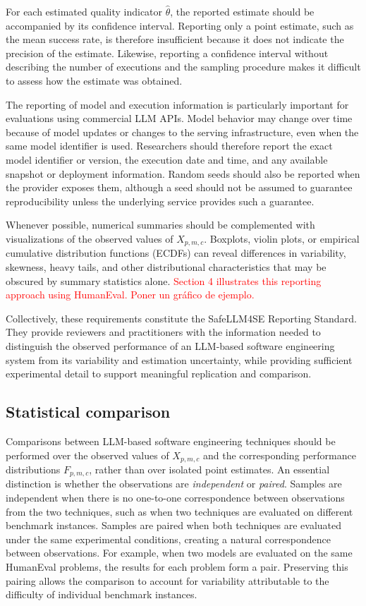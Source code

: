 \documentclass{IEEEcsmag}
\begin{document}
For each estimated quality indicator $\hat{\theta}$, the reported estimate should be accompanied by its confidence interval. Reporting only a point estimate, such as the mean success rate, is therefore insufficient because it does not indicate the precision of the estimate. Likewise, reporting a confidence interval without describing the number of executions and the sampling procedure makes it difficult to assess how the estimate was obtained.

The reporting of model and execution information is particularly important for evaluations using commercial LLM APIs. Model behavior may change over time because of model updates or changes to the serving infrastructure, even when the same model identifier is used. Researchers should therefore report the exact model identifier or version, the execution date and time, and any available snapshot or deployment information. Random seeds should also be reported when the provider exposes them, although a seed should not be assumed to guarantee reproducibility unless the underlying service provides such a guarantee.

Whenever possible, numerical summaries should be complemented with visualizations of the observed values of $X_{p,m,c}$. Boxplots, violin plots, or empirical cumulative distribution functions (ECDFs) can reveal differences in variability, skewness, heavy tails, and other distributional characteristics that may be obscured by summary statistics alone. \textcolor{red}{Section 4 illustrates this reporting approach using HumanEval. Poner un gráfico de ejemplo.}

Collectively, these requirements constitute the SafeLLM4SE Reporting Standard. They provide reviewers and practitioners with the information needed to distinguish the observed performance of an LLM-based software engineering system from its variability and estimation uncertainty, while providing sufficient experimental detail to support meaningful replication and comparison.


\subsection{Statistical comparison}
\label{subsection:SafeLLM4SE:comparsion}

Comparisons between LLM-based software engineering techniques should be performed over the observed values of $X_{p,m,c}$ and the corresponding performance distributions $F_{p,m,c}$, rather than over isolated point estimates. An essential distinction is whether the observations are \emph{independent} or \emph{paired}. Samples are independent when there is no one-to-one correspondence between observations from the two techniques, such as when two techniques are evaluated on different benchmark instances. Samples are paired when both techniques are evaluated under the same experimental conditions, creating a natural correspondence between observations. For example, when two models are evaluated on the same HumanEval problems, the results for each problem form a pair. Preserving this pairing allows the comparison to account for variability attributable to the difficulty of individual benchmark instances.
\end{document}
